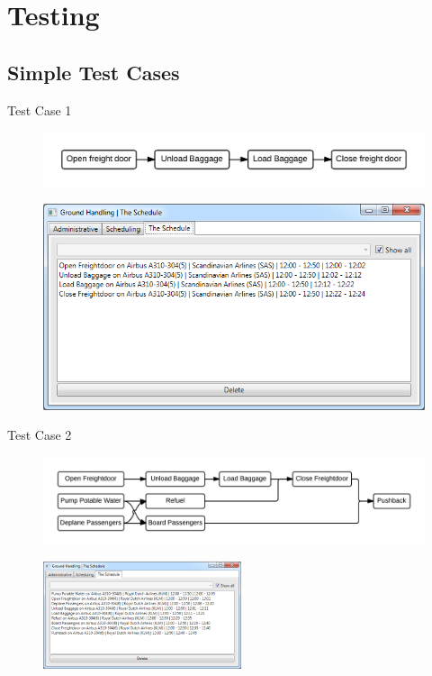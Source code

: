 \section{Testing}

\subsection{Simple Test Cases}
\begin{frame}{Test Case 1}
\begin{figure}
    \centering
    \includegraphics[width=\textwidth]{Grafik/TestCase1Illu}
\end{figure}
\begin{figure}
    \centering
    \includegraphics[width=\textwidth]{Grafik/TestCase1Result}
\end{figure}
\end{frame}

\begin{frame}{Test Case 2}
\begin{figure}
    \centering
    \includegraphics[width=\textwidth]{Grafik/TestCase2Illu}
\end{figure}
\begin{figure}
    \centering
    \includegraphics[width=220px]{Grafik/TestCase2Result}
\end{figure}
\end{frame}

